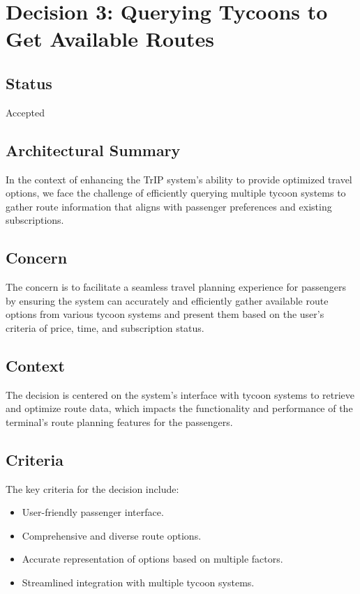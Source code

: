 \section*{Decision 3: Querying Tycoons to Get Available Routes}

\subsection*{Status}
Accepted

\subsection*{Architectural Summary}
In the context of enhancing the TrIP system's ability to provide optimized travel options, we face the challenge of efficiently querying multiple tycoon systems to gather route information that aligns with passenger preferences and existing subscriptions.

\subsection*{Concern}
The concern is to facilitate a seamless travel planning experience for passengers by ensuring the system can accurately and efficiently gather available route options from various tycoon systems and present them based on the user's criteria of price, time, and subscription status.

\subsection*{Context}
The decision is centered on the system's interface with tycoon systems to retrieve and optimize route data, which impacts the functionality and performance of the terminal's route planning features for the passengers.

\subsection*{Criteria}
The key criteria for the decision include:
\begin{itemize}
    \item User-friendly passenger interface.
    \item Comprehensive and diverse route options.
    \item Accurate representation of options based on multiple factors.
    \item Streamlined integration with multiple tycoon systems.
\end{itemize}

